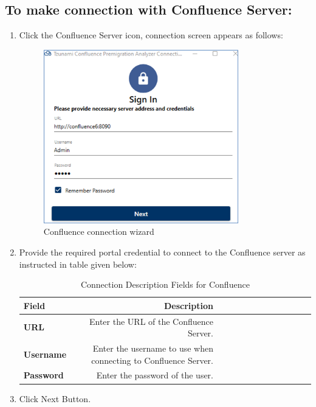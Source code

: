 \subsection*{To make connection with Confluence Server:}
\begin{enumerate}
	\item Click the Confluence Server icon, connection screen appears as follows:
	\begin{figure} 
		\centering
		\includegraphics[width=0.8\textwidth]{Images/Confluence connection wizard.png}
		\caption{Confluence connection wizard}
	\end{figure}
\item Provide the required portal credential to connect to the Confluence server as instructed in table given below:
\begin{table}[] \centering
	\begin{small}
		\begin{tabular}{@{}lrrrrrrrrrrrr@{}}\toprule
			\textbf{Field}  & \textbf{Description} \\ \midrule
			\textbf{URL} & Enter the URL of the Confluence Server.\\ \hdashline
			\textbf{Username} & Enter the username to use when connecting to Confluence Server.\\ \hdashline
			\textbf{Password} & Enter the password of the user.\\ 
			\bottomrule
		\end{tabular}
	\end{small}
	\caption{Connection Description Fields for Confluence}
\end{table}
\item Click Next Button.
\end{enumerate}
